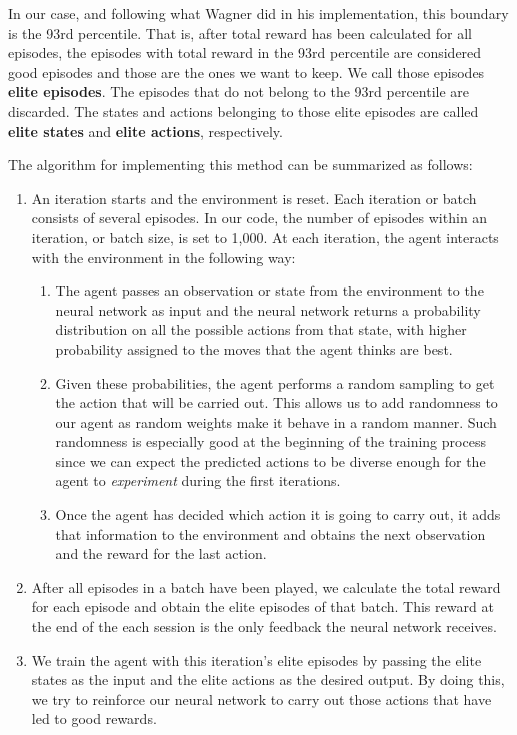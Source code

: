 \documentclass[11pt]{article}
\theoremstyle{definition}
\begin{document}
In our case, and following what Wagner did in his implementation, this boundary is the 93rd percentile. That is, after total reward has been calculated for all episodes, the episodes with total reward in the 93rd percentile are considered good episodes and those are the ones we want to keep. We call those episodes \textbf{elite episodes}. The episodes that do not belong to the 93rd percentile are discarded. The states and actions belonging to those elite episodes are called \textbf{elite states} and \textbf{elite actions}, respectively.

The algorithm for implementing this method can be summarized as follows: 

\begin{enumerate}
    \item An iteration starts and the environment is reset. Each iteration or batch consists of several episodes. In our code, the number of episodes within an iteration, or batch size, is set to 1,000. At each iteration, the agent interacts with the environment in the following way: 
    \begin{enumerate}[label*=\arabic*.]
        \item The agent passes an observation or state from the environment to the neural network as input and the neural network returns a probability distribution on all the possible actions from that state, with higher probability assigned to the moves that the agent thinks are best.
        \item Given these probabilities, the agent performs a random sampling to get the action that will be carried out. This allows us to add randomness to our agent as random weights make it behave in a random manner. Such randomness is especially good at the beginning of the training process since we can expect the predicted actions to be diverse enough for the agent to \textit{experiment} during the first iterations. \label{step2}
    \item Once the agent has decided which action it is going to carry out, it adds that information to the environment and obtains the next observation and the reward for the last action. 
    \end{enumerate}
    \item After all episodes in a batch have been played, we calculate the total reward for each episode and obtain the elite episodes of that batch. This reward at the end of the each session is the only feedback the neural network receives. 
    \item We train the agent with this iteration's elite episodes by passing the elite states as the input and the elite actions as the desired output. By doing this, we try to reinforce our neural network to carry out those actions that have led to good rewards.
\end{enumerate}
\end{document}
